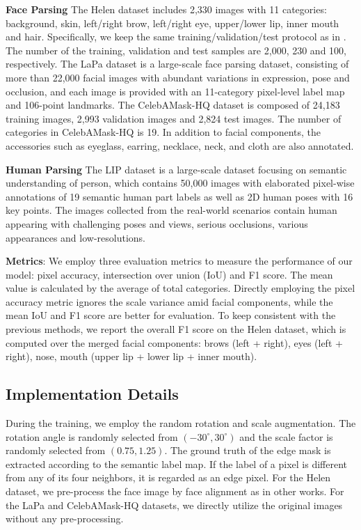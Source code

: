 \textbf{Face Parsing} The Helen dataset \cite{le2012interactive} includes 2,330 images with 11 categories: background, skin, left/right brow, left/right eye, upper/lower lip, inner mouth and hair. Specifically, we keep the same training/validation/test protocol as in \cite{le2012interactive}. The number of the training, validation and test samples are 2,000, 230 and 100, respectively. 
The LaPa dataset \cite{liu2020new} is a large-scale face parsing dataset, consisting of more than 22,000 facial images with abundant variations in expression, pose and occlusion, and each image is provided with an 11-category pixel-level label map and 106-point landmarks. 
The CelebAMask-HQ dataset \cite{CelebAMask-HQ} is composed of 24,183 training images, 2,993 validation images and 2,824 test images. The number of categories in CelebAMask-HQ is 19. In addition to facial components, the accessories such as eyeglass, earring, necklace, neck, and cloth are also annotated.

\textbf{Human Parsing} 
The LIP dataset \cite{gong2017look} is a large-scale dataset focusing on semantic understanding of person, which contains 50,000 images with elaborated pixel-wise annotations of 19 semantic human part labels as well as 2D human poses with 16 key points. The images collected from the real-world scenarios contain human appearing with challenging poses and views, serious occlusions, various appearances and low-resolutions.

\textbf{Metrics}: We employ three evaluation metrics to measure the performance of our model: pixel accuracy, intersection over union (IoU) and F1 score. The mean value is calculated by the average of total categories.
Directly employing the pixel accuracy metric ignores the scale variance amid facial components, while the mean IoU and F1 score are better for evaluation. 
To keep consistent with the previous methods, we report the overall F1 score on the Helen dataset, which is computed over the merged facial components: brows (left + right), eyes (left + right), nose, mouth (upper lip + lower lip + inner mouth).

\subsection{Implementation Details}



During the training, we employ the random rotation and scale augmentation. The rotation angle is randomly selected from $(-30^\circ, 30^\circ)$ and the scale factor is randomly selected from $(0.75, 1.25)$. The ground truth of the edge mask is extracted according to the semantic label map. If the label of a pixel is different from any of its four neighbors, it is regarded as an edge pixel. For the Helen dataset, we pre-process the face image by face alignment as in other works. For the LaPa and CelebAMask-HQ datasets, we directly utilize the original images without any pre-processing.


